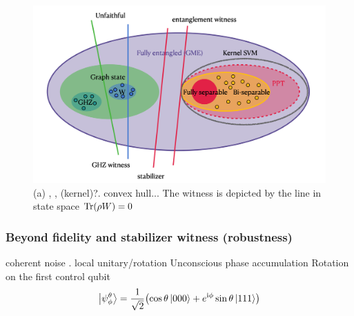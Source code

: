 \documentclass[
reprint,
aps,
pra,
]{revtex4-2}
\theoremstyle{plain}
\newtheorem{theorem}{Theorem}
\theoremstyle{definition}
\newcommand{\ew}{W}
\newcommand{\dm}{\rho}
\begin{document}
\begin{figure}[!ht]
	\centering
		\centering
		\includegraphics[width=.7\linewidth]{witness.png}
	\caption{(a) , ,  (kernel)?. convex hull... The witness is depicted by the line in state space $\Tr(\dm\ew)=0$}
	\label{fig:entangle}
\end{figure}

\subsubsection{Beyond fidelity and stabilizer witness (robustness)}
coherent noise \cite{zhouEntanglementDetectionCoherent2020}.
local unitary/rotation
Unconscious phase accumulation 
Rotation on the first control qubit 
\begin{equation}
	\ket{\psi_\phi^\theta}=\frac{1}{\sqrt{2}}\qty(\cos\theta\ket{000}+e^{\textup{i} \phi}\sin\theta\ket{111})
	\label{eq:coherent_noise}
\end{equation}
\end{document}
